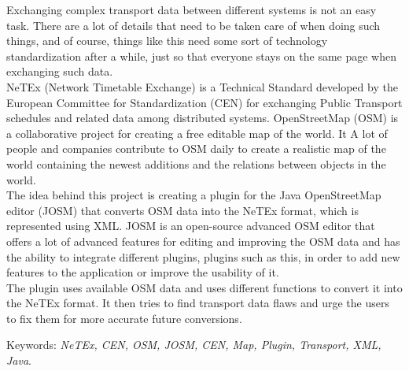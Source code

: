 Exchanging complex transport data between different systems is not an easy task. There are a lot of details that need to be taken care of when doing such things, and of course, things like this need some sort of technology standardization after a while, just so that everyone stays on the same page when exchanging such data.\\
\newline
NeTEx (Network Timetable Exchange) is a Technical Standard developed by the European Committee for Standardization (CEN) for exchanging Public Transport schedules and related data among distributed systems. OpenStreetMap (OSM) is a collaborative project for creating a free editable map of the world. It A lot of people and companies contribute to OSM daily to create a realistic map of the world containing the newest additions and the relations between objects in the world.\\
\newline
The idea behind this project is creating a plugin for the Java OpenStreetMap editor (JOSM) that converts OSM data into the NeTEx format, which is represented using XML. JOSM is an open-source advanced OSM editor that offers a lot of advanced features for editing and improving the OSM data and has the ability to integrate different plugins, plugins such as this, in order to add new features to the application or improve the usability of it.\\
\newline
The plugin uses available OSM data and uses different functions to convert it into the NeTEx format. It then tries to find transport data flaws and urge the users to fix them for more accurate future conversions.\\
\newline

Keywords: \textit{NeTEx, CEN, OSM, JOSM, CEN, Map, Plugin, Transport, XML, Java}.